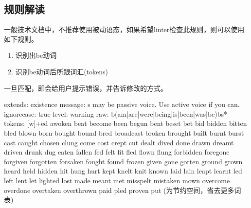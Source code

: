 \documentclass[letterpaper,10pt,english]{sphinxmanual}
\begin{document}
\subsection{规则解读}
\label{\detokenize{doc-quality/Vale:id3}}
\sphinxAtStartPar
一般技术文档中，不推荐使用被动语态，如果希望linter检查此规则，则可以使用如下规则。
\begin{enumerate}
%
\item {} 
\sphinxAtStartPar
识别出be动词

\item {} 
\sphinxAtStartPar
识别be动词后所跟词汇(tokens)

\end{enumerate}

\sphinxAtStartPar
一旦匹配，即会给用户提示错误，并告诉修改的方式。

\begin{sphinxVerbatim}[commandchars=\\\{\}]
extends: existence
message: \PYGZdq{}\PYGZsq{}\PYGZpc{}s\PYGZsq{} may be passive voice. Use active voice if you can.\PYGZdq{}
ignorecase: true
level: warning
raw:
  \PYGZhy{} \PYGZbs{}b(am|are|were|being|is|been|was|be)\PYGZbs{}b\PYGZbs{}s*
tokens:
  \PYGZhy{} \PYGZsq{}[\PYGZbs{}w]+ed\PYGZsq{}
  \PYGZhy{} awoken
  \PYGZhy{} beat
  \PYGZhy{} become
  \PYGZhy{} been
  \PYGZhy{} begun
  \PYGZhy{} bent
  \PYGZhy{} beset
  \PYGZhy{} bet
  \PYGZhy{} bid
  \PYGZhy{} bidden
  \PYGZhy{} bitten
  \PYGZhy{} bled
  \PYGZhy{} blown
  \PYGZhy{} born
  \PYGZhy{} bought
  \PYGZhy{} bound
  \PYGZhy{} bred
  \PYGZhy{} broadcast
  \PYGZhy{} broken
  \PYGZhy{} brought
  \PYGZhy{} built
  \PYGZhy{} burnt
  \PYGZhy{} burst
  \PYGZhy{} cast
  \PYGZhy{} caught
  \PYGZhy{} chosen
  \PYGZhy{} clung
  \PYGZhy{} come
  \PYGZhy{} cost
  \PYGZhy{} crept
  \PYGZhy{} cut
  \PYGZhy{} dealt
  \PYGZhy{} dived
  \PYGZhy{} done
  \PYGZhy{} drawn
  \PYGZhy{} dreamt
  \PYGZhy{} driven
  \PYGZhy{} drunk
  \PYGZhy{} dug
  \PYGZhy{} eaten
  \PYGZhy{} fallen
  \PYGZhy{} fed
  \PYGZhy{} felt
  \PYGZhy{} fit
  \PYGZhy{} fled
  \PYGZhy{} flown
  \PYGZhy{} flung
  \PYGZhy{} forbidden
  \PYGZhy{} foregone
  \PYGZhy{} forgiven
  \PYGZhy{} forgotten
  \PYGZhy{} forsaken
  \PYGZhy{} fought
  \PYGZhy{} found
  \PYGZhy{} frozen
  \PYGZhy{} given
  \PYGZhy{} gone
  \PYGZhy{} gotten
  \PYGZhy{} ground
  \PYGZhy{} grown
  \PYGZhy{} heard
  \PYGZhy{} held
  \PYGZhy{} hidden
  \PYGZhy{} hit
  \PYGZhy{} hung
  \PYGZhy{} hurt
  \PYGZhy{} kept
  \PYGZhy{} knelt
  \PYGZhy{} knit
  \PYGZhy{} known
  \PYGZhy{} laid
  \PYGZhy{} lain
  \PYGZhy{} leapt
  \PYGZhy{} learnt
  \PYGZhy{} led
  \PYGZhy{} left
  \PYGZhy{} lent
  \PYGZhy{} let
  \PYGZhy{} lighted
  \PYGZhy{} lost
  \PYGZhy{} made
  \PYGZhy{} meant
  \PYGZhy{} met
  \PYGZhy{} misspelt
  \PYGZhy{} mistaken
  \PYGZhy{} mown
  \PYGZhy{} overcome
  \PYGZhy{} overdone
  \PYGZhy{} overtaken
  \PYGZhy{} overthrown
  \PYGZhy{} paid
  \PYGZhy{} pled
  \PYGZhy{} proven
  \PYGZhy{} put
(为节约空间，省去更多词表)
\end{sphinxVerbatim}
\end{document}
